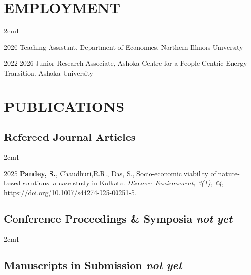 \documentclass[final, 12pt]{article}
\begin{document}
\section*{EMPLOYMENT}

\begin{hangparas}{2cm}{1}

2026 \tabto{2cm} Teaching Assistant, Department of Economics, Northern Illinois University

2022-2026 \tabto{2cm} Junior Research Associate, Ashoka Centre for a People Centric Energy Transition, Ashoka University
\\
\end{hangparas}

\section*{PUBLICATIONS}

\subsection*{Refereed Journal Articles}

\begin{hangparas}{2cm}{1}

2025 \tabto{2cm} {\bf Pandey, S.}, Chaudhuri,R.R., Das, S.,  Socio-economic viability of nature-based solutions: a case study in Kolkata. {\it Discover Environment, 3(1), 64}, \url{https://doi.org/10.1007/s44274-025-00251-5}. \\

\end{hangparas}

\subsection*{Conference Proceedings \& Symposia \it not yet}

\begin{hangparas}{2cm}{1}

\end{hangparas}

\subsection*{Manuscripts in Submission \it not yet}

\end{document}
